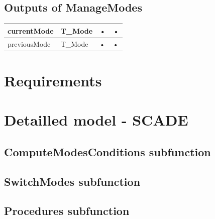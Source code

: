 \subsection{Outputs of ManageModes}

\begin{center}

\begin{supertabular}{| m{6cm} | m{3cm} | m{3cm} | m{3cm} |}
\hline 
currentMode & T\_Mode & • & • \\ 
\hline 
previousMode & T\_Mode & • & • \\ 
\hline 
\end{supertabular} 
	


\end{center}


\section{Requirements}

\section{Detailled model - SCADE}

\subsection{ComputeModesConditions subfunction}

\subsection{SwitchModes subfunction}


\subsection{Procedures subfunction}

